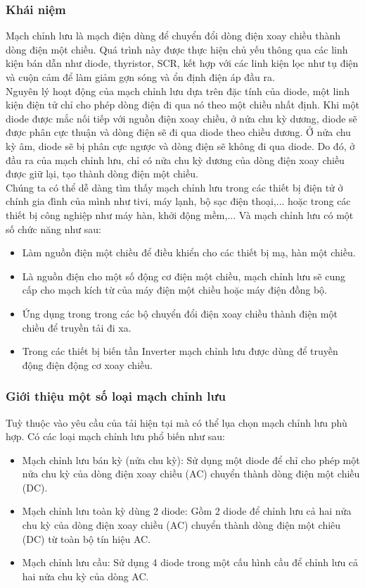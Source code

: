 \documentclass[a4paper,15pt]{article}
\begin{document}
\subsubsection{Khái niệm}
Mạch chỉnh lưu là mạch điện dùng để chuyển đổi dòng điện xoay chiều thành dòng điện một chiều. Quá trình này được thực hiện chủ yếu thông qua các linh kiện bán dẫn như diode, thyristor, SCR, kết hợp với các linh kiện lọc như tụ điện và cuộn cảm để làm giảm gợn sóng và ổn định điện áp đầu ra.\\
Nguyên lý hoạt động của mạch chỉnh lưu dựa trên đặc tính của diode, một linh kiện điện tử chỉ cho phép dòng điện đi qua nó theo một chiều nhất định. Khi một diode được mắc nối tiếp với nguồn điện xoay chiều, ở nửa chu kỳ dương, diode sẽ được phân cực thuận và dòng điện sẽ đi qua diode theo chiều dương. Ở nửa chu kỳ âm, diode sẽ bị phân cực ngược và dòng điện sẽ không đi qua diode. Do đó, ở đầu ra của mạch chỉnh lưu, chỉ có nửa chu kỳ dương của dòng điện xoay chiều được giữ lại, tạo thành dòng điện một chiều.\\
Chúng ta có thể dễ dàng tìm thấy mạch chỉnh lưu trong các thiết bị điện tử ở chính gia đình của mình như tivi, máy lạnh, bộ sạc điện thoại,... hoặc trong các thiết bị công nghiệp như máy hàn, khởi động mềm,... Và mạch chỉnh lưu có một số chức năng như sau:
\begin{itemize}
    \item Làm nguồn điện một chiều để điều khiển cho các thiết bị mạ, hàn một chiều.
    \item Là nguồn điện cho một số động cơ điện một chiều, mạch chỉnh lưu sẽ cung cấp cho mạch kích từ của máy điện một chiều hoặc máy điện đồng bộ.
    \item Ứng dụng trong trong các bộ chuyển đổi điện xoay chiều thành điện một chiều để truyền tải đi xa.
    \item Trong các thiết bị biến tần Inverter mạch chỉnh lưu được dùng để truyền động điện động cơ xoay chiều.
\end{itemize}
\subsubsection{Giới thiệu một số loại mạch chỉnh lưu}
Tuỳ thuộc vào yêu cầu của tải hiện tại mà có thể lụa chọn mạch chỉnh lưu phù hợp. Có các loại mạch chỉnh lưu phổ biến như sau:
\begin{itemize}
    \item Mạch chỉnh lưu bán kỳ (nửa chu kỳ): Sử dụng một diode để chỉ cho phép một nửa chu kỳ của dòng điện xoay chiều (AC) chuyển thành dòng điện một chiều (DC). 
    \item Mạch chỉnh lưu toàn kỳ dùng 2 diode: Gồm 2 diode để chỉnh lưu cả hai nửa chu kỳ của dòng điện xoay chiều (AC) chuyển thành dòng điện một chiêu (DC) từ toàn bộ tín hiệu AC.
    \item Mạch chỉnh lưu cầu: Sử dụng 4 diode trong một cấu hình cầu để chỉnh lưu cả hai nửa chu kỳ của dòng AC.
\end{itemize}
\newpage
\end{document}
